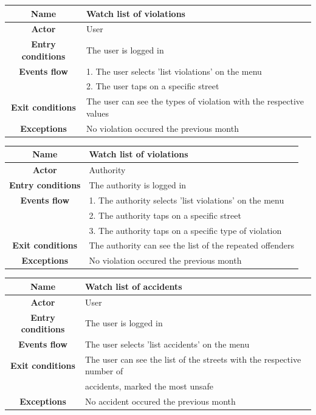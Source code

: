 \begin{flushleft}
\begin{tabular}{|c|l|}
\hline
    \textbf{Name} & Watch list of violations\\ \hline
    \textbf{Actor} & User\\ \hline
    \textbf{Entry conditions} &  The user is logged in\\ \hline
    \textbf{Events flow} 
    & 1. The user selects 'list violations' on the menu\\
    & 2. The user taps on a specific street\\ \hline
    \textbf{Exit conditions} &  The user can see the types of violation with the respective values\\ \hline
    \textbf{Exceptions} & No violation occured the previous month\\
\hline 
\end{tabular}
\end{flushleft}

\begin{flushleft}
\begin{tabular}{|c|l|}
\hline
    \textbf{Name} & Watch list of violations\\ \hline
    \textbf{Actor} & Authority\\ \hline
    \textbf{Entry conditions} &  The authority is logged in\\ \hline
    \textbf{Events flow} 
    & 1. The authority selects 'list violations' on the menu\\
    & 2. The authority taps on a specific street\\
    & 3. The authority taps on a specific type of violation\\ \hline
    \textbf{Exit conditions} &  The authority can see the list of the repeated offenders\\ \hline
    \textbf{Exceptions} & No violation occured the previous month\\
\hline 
\end{tabular} 
\end{flushleft}

\begin{flushleft}
\begin{tabular}{|c|l|}
\hline
    \textbf{Name} & Watch list of accidents\\ \hline
    \textbf{Actor} & User\\ \hline
    \textbf{Entry conditions} & The user is logged in\\ \hline
    \textbf{Events flow} & The user selects 'list accidents' on the menu\\ \hline
    \textbf{Exit conditions} 
    & The user can see the list of the streets with the respective number of\\
    & accidents, marked the most unsafe\\ \hline
    \textbf{Exceptions} & No accident occured the previous month\\
\hline 
\end{tabular}
\end{flushleft}

